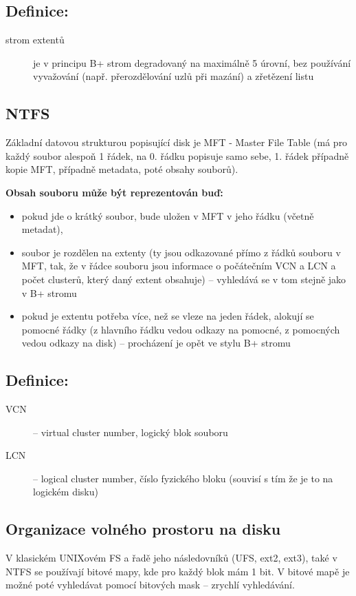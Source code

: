 \documentclass[a4paper, 11pt]{article}
\begin{document}
\subsection*{Definice:}
\begin{description}
\item[strom extentů] je v principu B+ strom degradovaný na maximálně 5 úrovní, bez používání vyvažování (např. přerozdělování uzlů při mazání) a zřetězení listu
\end{description}

\subsection{NTFS}
Základní datovou strukturou popisující disk je MFT - Master File Table (má pro každý soubor alespoň 1 řádek, na 0. řádku popisuje samo sebe, 1. řádek případně kopie MFT, případně metadata, poté obsahy souborů).
 
\textbf{Obsah souboru může být reprezentován buď:}
\begin{itemize}
    \item pokud jde o krátký soubor, bude uložen v MFT v jeho řádku (včetně metadat),
    \item soubor je rozdělen na extenty (ty jsou odkazované přímo z řádků souboru v MFT, tak, že v řádce souboru jsou informace o počátečním VCN a LCN a počet clusterů, který daný extent obsahuje) -- vyhledává se v tom stejně jako v B+ stromu
    \item pokud je extentu potřeba více, než se vleze na jeden řádek, alokují se pomocné řádky (z hlavního řádku vedou odkazy na pomocné, z pomocných vedou odkazy na disk) -- procházení je opět ve stylu B+ stromu
\end{itemize}
 
\subsection*{Definice:}
\begin{description}
\item[VCN] -- virtual cluster number, logický blok souboru 
\item[LCN] -- logical cluster number, číslo fyzického bloku (souvisí s tím že je to na logickém disku)
\end{description}

\subsection{Organizace volného prostoru na disku}
V klasickém UNIXovém FS a řadě jeho následovníků (UFS, ext2, ext3), také v NTFS se používají bitové mapy, kde pro každý blok mám 1 bit. V bitové mapě je možné poté vyhledávat pomocí bitových mask -- zrychlí vyhledávání.
 
\end{document}
